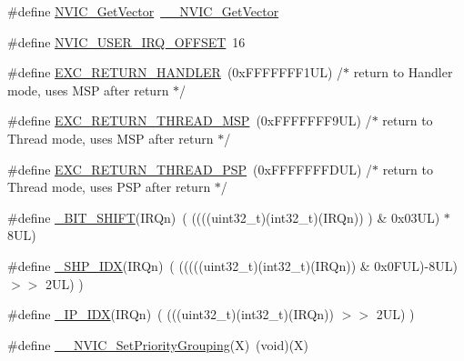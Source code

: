 \begin{DoxyCompactItemize}
\#define \hyperlink{group___c_m_s_i_s___core___n_v_i_c_functions_ga955eb1c33a3dcc62af11a8385e8c0fc8}{N\+V\+I\+C\+\_\+\+Get\+Vector}~\hyperlink{group___c_m_s_i_s___core___n_v_i_c_functions_ga44b665d2afb708121d9b10c76ff00ee5}{\+\_\+\+\_\+\+N\+V\+I\+C\+\_\+\+Get\+Vector}
\item 
\#define \hyperlink{group___c_m_s_i_s___core___n_v_i_c_functions_ga8045d905a5ca57437d8e6f71ffcb6df5}{N\+V\+I\+C\+\_\+\+U\+S\+E\+R\+\_\+\+I\+R\+Q\+\_\+\+O\+F\+F\+S\+ET}~16
\item 
\#define \hyperlink{group___c_m_s_i_s___core___n_v_i_c_functions_gaa6fa2b10f756385433e08522d9e4632f}{E\+X\+C\+\_\+\+R\+E\+T\+U\+R\+N\+\_\+\+H\+A\+N\+D\+L\+ER}~(0x\+F\+F\+F\+F\+F\+F\+F1\+U\+L)     /$\ast$ return to Handler mode, uses M\+S\+P after return                               $\ast$/
\item 
\#define \hyperlink{group___c_m_s_i_s___core___n_v_i_c_functions_gaea4703101b5e679f695e231f7ee72331}{E\+X\+C\+\_\+\+R\+E\+T\+U\+R\+N\+\_\+\+T\+H\+R\+E\+A\+D\+\_\+\+M\+SP}~(0x\+F\+F\+F\+F\+F\+F\+F9\+U\+L)     /$\ast$ return to Thread mode, uses M\+S\+P after return                                $\ast$/
\item 
\#define \hyperlink{group___c_m_s_i_s___core___n_v_i_c_functions_ga9998daf0fbdf31dbc8f81cd604b58175}{E\+X\+C\+\_\+\+R\+E\+T\+U\+R\+N\+\_\+\+T\+H\+R\+E\+A\+D\+\_\+\+P\+SP}~(0x\+F\+F\+F\+F\+F\+F\+F\+D\+U\+L)     /$\ast$ return to Thread mode, uses P\+S\+P after return                                $\ast$/
\item 
\#define \hyperlink{group___c_m_s_i_s___core___n_v_i_c_functions_ga53c75b28823441c6153269f0ecbed878}{\+\_\+\+B\+I\+T\+\_\+\+S\+H\+I\+FT}(I\+R\+Qn)~(  ((((uint32\+\_\+t)(int32\+\_\+t)(I\+R\+Qn))         )      \&  0x03\+U\+L) $\ast$ 8\+U\+L)
\item 
\#define \hyperlink{group___c_m_s_i_s___core___n_v_i_c_functions_gaee4f7eb5d7e770ad51489dbceabb1755}{\+\_\+\+S\+H\+P\+\_\+\+I\+DX}(I\+R\+Qn)~( (((((uint32\+\_\+t)(int32\+\_\+t)(I\+R\+Qn)) \& 0x0\+F\+U\+L)-\/8\+U\+L) $>$$>$    2\+U\+L)      )
\item 
\#define \hyperlink{group___c_m_s_i_s___core___n_v_i_c_functions_ga370ec4b1751a6a889d849747df3763a9}{\+\_\+\+I\+P\+\_\+\+I\+DX}(I\+R\+Qn)~(   (((uint32\+\_\+t)(int32\+\_\+t)(I\+R\+Qn))                $>$$>$    2\+U\+L)      )
\item 
\#define \hyperlink{group___c_m_s_i_s___core___n_v_i_c_functions_ga6834dd8c9c59394f1b544b57665293a4}{\+\_\+\+\_\+\+N\+V\+I\+C\+\_\+\+Set\+Priority\+Grouping}(X)~(void)(X)
\item 

\end{DoxyCompactItemize}

